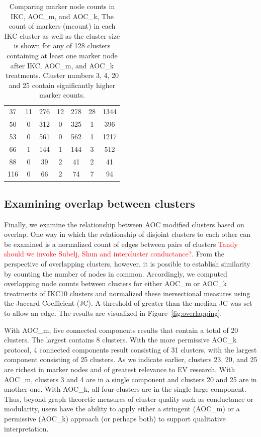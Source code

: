\documentclass[12pt, oneside]{article}   	%
\begin{document}
\begin{table}[!ht]
{\begin{tabular}{ccccccc}
37 &  11 & 276 &  12 & 278 &  28 & 1344 \\ 
50 &   0 & 312 &   0 & 325 &   1 & 396 \\ 
53 &   0 & 561 &   0 & 562 &   1 & 1217 \\ 
66 &   1 & 144 &   1 & 144 &   3 & 512 \\ 
88 &   0 &  39 &   2 &  41 &   2 &  41 \\ 
116 &   0 &  66 &   2 &  74 &   7 &  94 \\ 
   \hline
\end{tabular}}
\captionsetup{width=0.9\textwidth}
\caption{Comparing marker node counts in IKC, AOC\_m, and AOC\_k, The count of markers (mcount) in each IKC cluster as well as the cluster size is shown for any of 128 clusters containing at least one marker node after IKC,  AOC\_m, and AOC\_k treatments. Cluster numbers 3, 4, 20 and 25 contain significantly higher marker counts.}
\label{tab:marker-node-table}
\end{table}

\subsection{Examining overlap between clusters}
Finally, we examine the relationship between AOC modified clusters based on overlap. One way in which the relationship of disjoint clusters to each other can be examined is a normalized count of edges between pairs of clusters \textcolor{red}{Tandy should we invoke Subelj, Shun and intercluster conductance?}. From the perspective of overlapping clusters, however, it is possible to establish similarity by counting the number of nodes in common. Accordingly, we computed overlapping node counts between clusters for either AOC\_m or AOC\_k treatments of IKC10 clusters and normalized these inersectional measures using the Jaccard Coefficient (JC). A threshold of greater than  the median JC was set to allow an edge. The results are visualized in Figure~\ref{fig:overlapping}.

With AOC\_m, five connected components results that contain a total of 20 clusters. The largest contains 8 clusters. With the more permissive AOC\_k protocol, 4 connected components result consisting of 31 clusters, with the largest component consisting of 25 clusters. As we indicate earlier, clusters 23, 20, and 25 are richest in marker nodes and of greatest relevance to EV research. With AOC\_m, clusters 3 and 4 are in a single component and clusters 20 and 25 are in another one. With AOC\_k, all four clusters are in the single large component. Thus, beyond graph theoretic measures of cluster quality such as conductance or modularity, users have the ability to apply either a stringent (AOC\_m) or a permissive (AOC\_k) approach (or perhaps both) to support qualitative interpretation.
\end{document}
